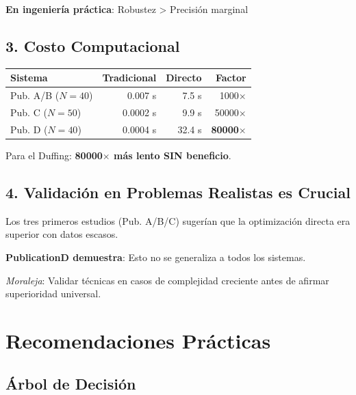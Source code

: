 \documentclass[11pt,a4paper]{article}
\begin{document}
\textbf{En ingeniería práctica}: Robustez > Precisión marginal

\subsection{3. Costo Computacional}

\begin{table}[H]
\centering
\begin{tabular}{lrrr}
\toprule
\textbf{Sistema} & \textbf{Tradicional} & \textbf{Directo} & \textbf{Factor} \\
\midrule
Pub. A/B ($N=40$) & 0.007 s & 7.5 s & 1000$\times$ \\
Pub. C ($N=50$) & 0.0002 s & 9.9 s & 50000$\times$ \\
Pub. D ($N=40$) & 0.0004 s & 32.4 s & \textbf{80000$\times$} \\
\bottomrule
\end{tabular}
\end{table}

Para el Duffing: \textbf{80000$\times$ más lento SIN beneficio}.

\subsection{4. Validación en Problemas Realistas es Crucial}

Los tres primeros estudios (Pub. A/B/C) sugerían que la optimización directa era superior con datos escasos.

\textbf{PublicationD demuestra}: Esto no se generaliza a todos los sistemas.

\textit{Moraleja}: Validar técnicas en casos de complejidad creciente antes de afirmar superioridad universal.

\section{Recomendaciones Prácticas}

\subsection{Árbol de Decisión}
\end{document}
